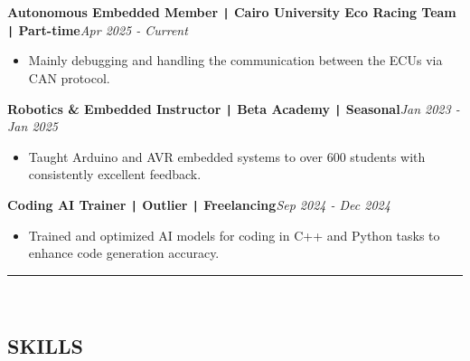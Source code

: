 \documentclass[11pt,a4paper]{article}
\begin{document}
\begin{flushleft}
\textbf{Autonomous Embedded Member \texttt{|} Cairo University Eco Racing Team \texttt{|} Part-time}\hfill\textit{Apr 2025 - Current}\\
\end{flushleft}
\vspace{-0.7cm}
\begin{itemize}
\item \setlength{\itemsep}{-0.0em} Mainly debugging and handling the communication between the ECUs via CAN protocol.
\end{itemize}
\vspace{-0.7cm}
\begin{flushleft}
\textbf{Robotics \& Embedded Instructor \texttt{|} Beta Academy \texttt{|} Seasonal}\hfill\textit{Jan 2023 - Jan 2025}\\
\end{flushleft}
\vspace{-0.7cm}
\begin{itemize}
\item \setlength{\itemsep}{-0.0em} Taught Arduino and AVR embedded systems to over 600 students with consistently excellent feedback.
\end{itemize}
\vspace{-0.7cm}
\begin{flushleft}
\textbf{Coding AI Trainer \texttt{|} Outlier \texttt{|} Freelancing}\hfill\textit{Sep 2024 - Dec 2024}\\
\end{flushleft}
\vspace{-0.7cm}
\begin{itemize}
\item \setlength{\itemsep}{-0.0em} Trained and optimized AI models for coding in C++ and Python tasks to enhance code generation accuracy.
\end{itemize}
\vspace{-0.7cm}
\vspace{0.2cm}
\rule{\textwidth}{0.3pt}\\
\vspace{-0.9cm}
\begin{center}
\section*{\fontsize{14}{18}\textbf\selectfont SKILLS}
\end{center}
\vspace{-0.4cm}
\renewcommand{\arraystretch}{1.8} %
\end{document}
